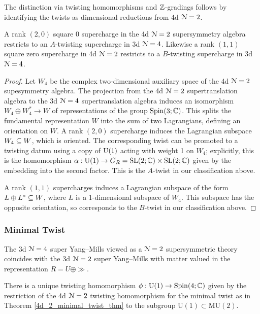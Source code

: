 \documentclass[10pt, oneside]{article}
\newcommand{\MU}{\mathrm{MU}}
\renewcommand{\U}{\mathrm{U}}
\begin{document}
The distinction via twisting homomorphisms and $\mathbb Z$-gradings follows by identifying the twists as dimensional reductions from 4d $\mathcal{N}=2$.
 
\begin{lemma} \label{3d_4_orbits_lemma}
A rank $(2,0)$ square 0 supercharge in the 4d $\mathcal{N}=2$ supersymmetry algebra restricts to an $A$-twisting supercharge in 3d $\mathcal{N}=4$.  Likewise a rank $(1,1)$ square zero supercharge in 4d $\mathcal{N}=2$ restricts to a $B$-twisting supercharge in 3d $\mathcal{N}=4$.
\end{lemma}

\begin{proof}
Let $W_4$ be the complex two-dimensional auxiliary space of the 4d $\mathcal N=2$ supesymmetry algebra.
The projection from the 4d $\mathcal{N}=2$ supertranslation algebra to the 3d $\mathcal{N}=4$ supertranslation algebra induces an isomorphism $W_4 \oplus W_4^* \to W$ of representations of the group $\mathrm{Spin}(3;\mathbb C)$.  
This splits the fundamental representation $W$ into the sum of two Lagrangians, defining an orientation on $W$. 
A rank $(2,0)$ supercharge induces the Lagrangian subspace $W_4 \subseteq W$, which is oriented.  The corresponding twist can be promoted to a twisting datum using a copy of $\mathrm{U}(1)$ acting with weight 1 on $W_4$; explicitly, this is the homomorphism $\alpha : \U(1) \to G_R = \SL(2;\CC) \times \SL(2;\CC)$ given by the embedding into the second factor. 
This is the $A$-twist in our classification above.

A rank $(1,1)$ supercharges induces a Lagrangian subspace of the form $L \oplus L^* \subseteq W$, where $L$ is a 1-dimensional subspace of $W_4$.  This subspace has the opposite orientation, so corresponds to the $B$-twist in our classification above.  
\end{proof}

\subsubsection{Minimal Twist}
\label{sect:3d_4_minimal_twist}
The 3d $\mathcal N=4$ super Yang--Mills viewed as a $\mathcal N=2$ supersymmetric theory coincides with the 3d $\mathcal N=2$ super Yang--Mills with matter valued in the representation $R = U \oplus \gg$.  

There is a unique twisting homomorphism $\phi : \U(1) \to \Spin(4;\CC)$ given by the restriction of the 4d $\mathcal N=2$ twisting homomorphism for the minimal twist as in Theorem \ref{4d_2_minimal_twist_thm} to the subgroup $\U(1) \subset \MU(2)$. 
\end{document}
